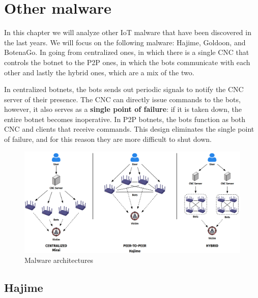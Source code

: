 \chapter{Other malware}

In this chapter we will analyze other IoT malware that have been discovered in the last years. We will focus on the following malware: Hajime, Goldoon, and BotenaGo. In  going from centralized ones, in which there is a single CNC that controls the botnet to the P2P ones, in which the bots communicate with each other and lastly the hybrid ones, which are a mix of the two.

In centralized botnets, the bots sends out periodic signals to notify the CNC server of their presence. The CNC can directly issue commands to the bots, however, it also serves as a \textbf{single point of failure}: if it is taken down, the entire botnet becomes inoperative. In P2P botnets, the bots function as both CNC and clients that receive commands. This design eliminates the single point of failure, and for this reason they are more difficult to shut down. 

\begin{figure}[ht]
	\centering
	\includegraphics[scale=0.25]{resources/images/malware-architectures.png}
	\caption{Malware architectures}
	\label{fig:malware-architectures}
\end{figure}

\section{Hajime}

